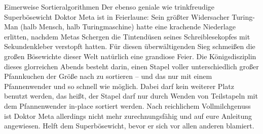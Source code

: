 \begin{frame}{Eimerweise Sortieralgorithmen}
	Der ebenso geniale wie trinkfreudige Superbösewicht Doktor Meta ist in Feierlaune: Sein größter Widersacher Turing-Man {\small (halb Mensch, halb Turingmaschine)} hatte eine krachende Niederlage erlitten, nachdem Metas Schergen die Tintendüsen seines Schreiblesekopfes mit Sekundenkleber verstopft hatten. Für diesen überwältigenden Sieg schmeißen die großen Bösewichte dieser Welt natürlich eine grandiose Feier. Die Königsdisziplin dieses glorreichen Abends besteht darin, einen Stapel voller unterschiedlich großer Pfannkuchen der Größe nach zu sortieren – und das nur mit einem Pfannenwender und so schnell wie möglich. Dabei darf kein weiterer Platz benutzt werden, das heißt, der Stapel darf nur durch Wenden von Teilstapeln mit dem Pfannenwender in-place sortiert werden. Nach reichlichem Vollmilchgenuss ist Doktor Meta allerdings nicht mehr zurechnungsfähig und auf eure Anleitung angewiesen. Helft dem Superbösewicht, bevor er sich vor allen anderen blamiert.
\end{frame}

